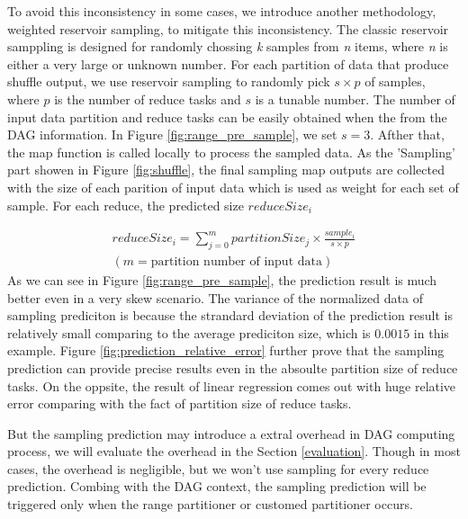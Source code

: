 \documentclass[10pt,twocolumn]{article}
\begin{document}
To avoid this inconsistency in some cases, we introduce another methodology, weighted reservoir sampling, to mitigate this inconsistency. The classic reservoir samppling is designed for randomly chossing \textit{k} samples from \textit{n} items, where \textit{n} is either a very large or unknown number\cite{reservoir}. For each partition of data that produce shuffle output, we use reservoir sampling to randomly pick $s \times p$ of samples, where $p$ is the number of reduce tasks and $s$ is a tunable number. The number of input data partition and reduce tasks can be easily obtained when the from the DAG information. In Figure \ref{fig:range_pre_sample}, we set $s = 3$. Afther that, the map function is called locally to process the sampled data. As the 'Sampling' part showen in Figure \ref{fig:shuffle}, the final sampling map outputs are collected with the size of each parition of input data which is used as weight for each set of sample. For each reduce, the predicted size $reduceSize_i$

\begin{equation} 
\begin{aligned}
	reduceSize_i = {\displaystyle\sum_{j=0}^{m} {partitionSize_j \times \frac{sample_i}{s \times p}}} \\ 
	{\left( m = \text{partition number of input data} \right)}
\end{aligned}
\end{equation}
As we can see in Figure \ref{fig:range_pre_sample}, the prediction result is much better even in a very skew scenario. The variance of the normalized data of sampling prediciton is because the strandard deviation of the prediction result is relatively small comparing to the average prediciton size, which is $0.0015$ in this example. Figure \ref{fig:prediction_relative_error} further prove that the sampling prediction can provide precise results even in the absoulte partition size of reduce tasks. On the oppsite, the result of linear regression comes out with huge relative error comparing with the fact of partition size of reduce tasks.

But the sampling prediction may introduce a extral overhead in DAG computing process, we will evaluate the overhead in the Section \ref{evaluation}. Though in most cases, the overhead is negligible, but we won't use sampling for every reduce prediction. Combing with the DAG context, the sampling prediction will be triggered only when the range partitioner or customed partitioner occurs.
\end{document}
